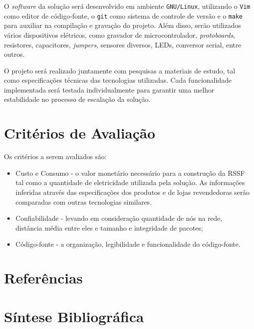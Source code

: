 \documentclass[
    12pt,               %
    a4paper,            %
    english,            %
    brazil,             %
    ]{article}
\begin{document}
O \textit{software} da solução será desenvolvido em ambiente \texttt{GNU/Linux}, utilizando o \texttt{Vim} como editor de
código-fonte, o \texttt{git} como sistema de controle de versão e o \texttt{make} para auxiliar na compilação e gravação do
projeto. Além disso, serão utilizados vários dispositivos elétricos, como gravador de microcontrolador, \textit{protoboards},
resistores, capacitores, \textit{jumpers}, sensores diversos, LEDs, conversor serial, entre outros.

O projeto será realizado juntamente com pesquisas a materiais de estudo, tal como especificações técnicas das tecnologias
utilizadas. Cada funcionalidade implementada será testada individualmente para garantir uma melhor estabilidade no processo de
escalação da solução.


\section{Critérios de Avaliação}

Os critérios a serem avaliados são:
\begin{itemize}
	\item Custo e Consumo - o valor monetário necessário para a construção da RSSF tal como a quantidade de eletricidade
	utilizada pela solução. As informações inferidas através das especificações dos produtos e de lojas revendedoras serão
	comparadas com outras tecnologias similares.
	\item Confiabilidade - levando em consideração quantidade de nós na rede, distância média entre eles e tamanho e integridade de pacotes;
	\item Código-fonte - a organização, legibilidade e funcionalidade do código-fonte.
\end{itemize}


\section{Referências}

    \vspace{-4.3em}
    \renewcommand\refname{}

    

\section{Síntese Bibliográfica}


\end{document}
